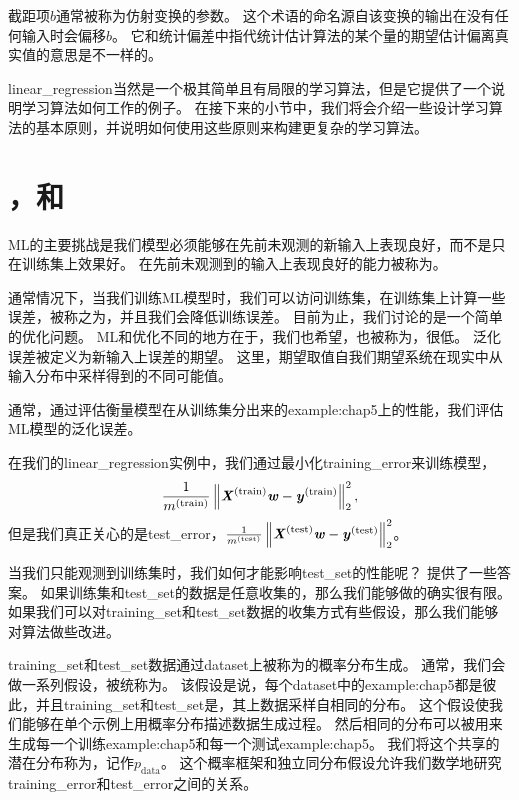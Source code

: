 
截距项$b$通常被称为仿射变换的参数。
这个术语的命名源自该变换的输出在没有任何输入时会偏移$b$。
它和统计偏差中指代统计估计算法的某个量的期望估计偏离真实值的意思是不一样的。

\gls{linear_regression}当然是一个极其简单且有局限的学习算法，但是它提供了一个说明学习算法如何工作的例子。
在接下来的小节中，我们将会介绍一些设计学习算法的基本原则，并说明如何使用这些原则来构建更复杂的学习算法。

\section{，和}
\label{sec:capacity_overfitting_and_underfitting}
\gls{ML}的主要挑战是我们模型必须能够在先前未观测的新输入上表现良好，而不是只在训练集上效果好。
在先前未观测到的输入上表现良好的能力被称为。

通常情况下，当我们训练\gls{ML}模型时，我们可以访问训练集，在训练集上计算一些误差，被称之为，并且我们会降低训练误差。
目前为止，我们讨论的是一个简单的优化问题。
\gls{ML}和优化不同的地方在于，我们也希望，也被称为，很低。
泛化误差被定义为新输入上误差的期望。
这里，期望取值自我们期望系统在现实中从输入分布中采样得到的不同可能值。

通常，通过评估衡量模型在从训练集分出来的\gls{example:chap5}上的性能，我们评估\gls{ML}模型的泛化误差。

在我们的\gls{linear_regression}实例中，我们通过最小化\gls{training_error}来训练模型，
\begin{equation}
    \frac{1}{m^{(\text{train})}} \left\lVert\boldsymbol{\mathit{X}}^{(\text{train})}\boldsymbol{\mathit{w}} - \boldsymbol{\mathit{y}}^{(\text{train})}\right\rVert_2^2,
\end{equation}
但是我们真正关心的是\gls{test_error}，$\frac{1}{m^{(\text{test})}} \left\lVert\boldsymbol{\mathit{X}}^{(\text{test})}\boldsymbol{\mathit{w}} - \boldsymbol{\mathit{y}}^{(\text{test})}\right\rVert_2^2$。


当我们只能观测到训练集时，我们如何才能影响\gls{test_set}的性能呢？
提供了一些答案。
如果训练集和\gls{test_set}的数据是任意收集的，那么我们能够做的确实很有限。
如果我们可以对\gls{training_set}和\gls{test_set}数据的收集方式有些假设，那么我们能够对算法做些改进。

\gls{training_set}和\gls{test_set}数据通过\gls{dataset}上被称为的概率分布生成。
通常，我们会做一系列假设，被统称为。
该假设是说，每个\gls{dataset}中的\gls{example:chap5}都是彼此，并且\gls{training_set}和\gls{test_set}是，其上数据采样自相同的分布。
这个假设使我们能够在单个示例上用概率分布描述数据生成过程。
然后相同的分布可以被用来生成每一个训练\gls{example:chap5}和每一个测试\gls{example:chap5}。
我们将这个共享的潜在分布称为，记作$p_{\text{data}}$。
这个概率框架和独立同分布假设允许我们数学地研究\gls{training_error}和\gls{test_error}之间的关系。

